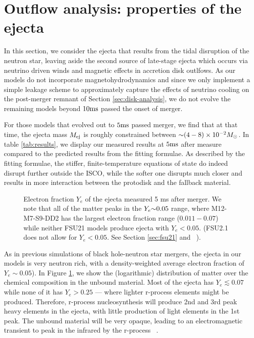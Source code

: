 \section{Outflow analysis: properties of the ejecta}
\label{sec:tail-analysis}

In this section, we consider the ejecta that results from the tidal disruption of the neutron star, leaving aside the second source of late-stage ejecta which occurs via neutrino driven winds and magnetic effects in accretion disk outlfows.  
As our models do not incorporate magnetohydrodynamics and since we only implement a simple leakage scheme to approximately capture the effects of neutrino cooling on the post-merger remnant of Section \ref{sec:disk-analysis}, we do not evolve the remaining models beyond $10 {\rm ms}$ passed the onset of merger.

For those models that evolved out to $5 {\rm ms}$ passed merger, we find that at that time, the ejecta mass $M_{\rm ej}$ is roughly constrained between $\mathord{\sim} (4 - 8) \times 10^{-2} M_\odot$.
In table \ref{tab:results}, we display our measured results at $5 {\rm ms}$ after measure compared to the predicted results from the fitting formulae.  
As described by the fitting formulae, the stiffer, finite-temperature equations of state do indeed disrupt further outside the ISCO, while the softer one disrupts much closer and results in more interaction between the protodisk and the fallback material.


\begin{figure}
	\centering
	
	\caption[Composition of the ejecta]{
		Electron fraction $Y_e$ of the ejecta measured 5 ms after merger.  
		We note that all of the matter peaks in the $Y_e \mathord{\sim} 0.05$ range, where M12-M7-S9-DD2 has the largest electron fraction range ($0.011 - 0.07$) while neither FSU21 models produce ejecta with $Y_e < 0.05$. 
		(FSU2.1 does not allow for $Y_e < 0.05$.  See Section \ref{sec:fsu21} and ~\cite{shen2011second}).
	}
	\label{fig:Yehisto}
\end{figure}

As in previous simulations of black hole-neutron star mergers, the ejecta in our models is very neutron rich, with a density-weighted average electron fraction of $Y_e \sim 0.05$).  
In Figure \ref{fig:Yehisto}, we show the (logarithmic) distribution of matter over the chemical composition in the unbound material.  
Most of the ejecta has $Y_e \lesssim 0.07$ while none of it has $Y_e > 0.25$ --- where lighter r-process elements might be produced.
Therefore, r-process nucleosynthesis will produce 2nd and 3rd peak heavy elements in the ejecta, with little production of light elements in the 1st peak.  
The unbound material will be very opaque, leading to an electromagnetic transient to peak in the infrared by the r-process ~\cite{2013ApJ...775...18B}.

